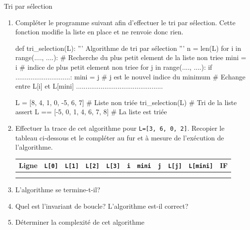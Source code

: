 \begin{exercice_cours}{Tri par sélection}{}
	\begin{enumerate}
		\item 	Compléter le programme suivant afin d'effectuer le tri par sélection. Cette fonction modifie la liste en place et ne renvoie donc rien.


	\begin{CodePythontexAlt}[TaillePolice=\large, Largeur=1\linewidth,Centre,PremLigne=1]{}
		def tri_selection(L):
			''' Algorithme de tri par sélection '''
			n = len(L)
			for i in range(...., ....):
				# Recherche du plus petit element de la liste non triee
				mini = i		# indice de plus petit element non triee
				for j in range(...., ....):
					if .............................:
						mini = j 		# j est le nouvel indice du minimum	
				# Echange entre L[i] et L[mini]
				..............................................

		L = [8, 4, 1, 0, -5, 6, 7]				 # Liste non triée
		tri_selection(L)					   # Tri de la liste
		assert L == [-5, 0, 1, 4, 6, 7, 8] 	# La liste est triée
		\end{CodePythontexAlt}


		\item Effectuer la trace de cet algorithme pour \verb+L=[3, 6, 0, 2]+. Recopier le tableau ci-dessous et le compléter au fur et à mesure de l'exécution de l'algorithme.
		
		\begin{center}
			
			\begin{tabular}{|c|c|c|c|c|c|c|c|c|c|c|}
			\hline
				Ligne & \verb+L[0]+ & \verb+L[1]+ & \verb+L[2]+ & \verb+L[3]+ & \verb+i+ & \verb+mini+ & \verb+j+ & \verb+L[j]+ & \verb+L[mini]+ & IF  \\
			\hline
				&&&&&&&&&&\\ \hline
				&&&&&&&&&&\\ \hline

		\end{tabular}
	\end{center}

	\item L'algorithme se termine-t-il? \dotfill{}
	\dotfill{}

	\item Quel est l'invariant de boucle? L'algorithme est-il correct? \dotfill{}
	
	\dotfill{}

	\dotfill{}

	\dotfill{}

	\dotfill{}

	\item Déterminer la complexité de cet algorithme \dotfill{}
	\end{enumerate}

\end{exercice_cours}
